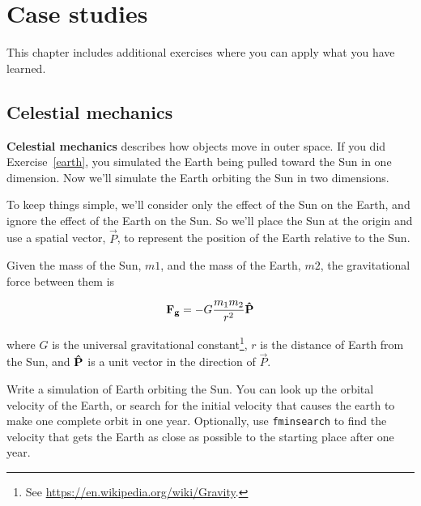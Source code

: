 \documentclass[main.tex]{subfiles}
\begin{document}
\chapter{Case studies}

This chapter includes additional exercises where you can apply what you have learned.

\section{Celestial mechanics}


{\bf Celestial mechanics} describes how objects move in outer space.
If you did Exercise~\ref{earth}, you simulated the Earth being pulled toward the Sun in one dimension.  Now we'll simulate the Earth orbiting the Sun in two dimensions.


To keep things simple, we'll consider only the effect of the Sun on the Earth, and ignore the effect of the Earth on the Sun.  So we'll place the Sun at the origin and use a spatial vector, $\vec{P}$, to represent the position of the Earth relative to the Sun.


Given the mass of the Sun, $m1$, and the mass of the Earth, $m2$, the gravitational force between them is

\begin{equation*}
\vec{F_g} = -G \frac{m_1 m_2}{r^2} \uvec{P}
\end{equation*}

where $G$ is the universal gravitational constant\footnote{See \url{https://en.wikipedia.org/wiki/Gravity}.},
$r$ is the distance of Earth from the Sun, and
$\uvec{P}$ is a unit vector in the direction of $\vec{P}$.


Write a simulation of Earth orbiting the Sun.  You can look up the orbital velocity of the Earth, or search for the initial velocity that causes the earth to make one complete orbit in one year.  Optionally, use {\tt fminsearch} to find the velocity that gets the Earth as close as possible to the starting place after one year.

\end{document}
